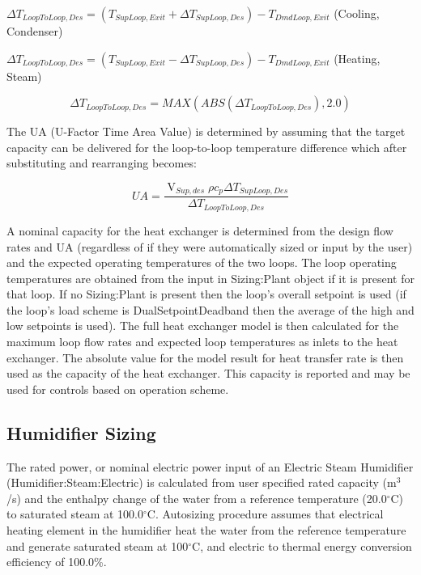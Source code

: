 \(\Delta {T_{LoopToLoop,Des}} = \left( {{T_{SupLoop,Exit}} + \Delta {T_{SupLoop,Des}}} \right) - {T_{DmdLoop,Exit}}\) (Cooling, Condenser)

\(\Delta {T_{LoopToLoop,Des}} = \left( {{T_{SupLoop,Exit}} - \Delta {T_{SupLoop,Des}}} \right) - {T_{DmdLoop,Exit}}\) (Heating, Steam)

\begin{equation}
\Delta {T_{LoopToLoop,Des}} = MAX\left( {ABS\left( {\Delta {T_{LoopToLoop,Des}}} \right),2.0} \right)
\end{equation}

The UA (U-Factor Time Area Value) is determined by assuming that the target capacity can be delivered for the loop-to-loop temperature difference which after substituting and rearranging becomes:

\begin{equation}
UA = \frac{{{{\mathop {V}\limits }_{Sup,des}}\rho {c_p}\Delta {T_{SupLoop,Des}}}}{{\Delta {T_{LoopToLoop,Des}}}}
\end{equation}

A nominal capacity for the heat exchanger is determined from the design flow rates and UA (regardless of if they were automatically sized or input by the user) and the expected operating temperatures of the two loops. The loop operating temperatures are obtained from the input in Sizing:Plant object if it is present for that loop. If no Sizing:Plant is present then the loop's overall setpoint is used (if the loop's load scheme is DualSetpointDeadband then the average of the high and low setpoints is used). The full heat exchanger model is then calculated for the maximum loop flow rates and expected loop temperatures as inlets to the heat exchanger. The absolute value for the model result for heat transfer rate is then used as the capacity of the heat exchanger. This capacity is reported and may be used for controls based on operation scheme.

\subsection{Humidifier Sizing}\label{humidifier-sizing}

The rated power, or nominal electric power input of an Electric Steam Humidifier (Humidifier:Steam:Electric) is calculated from user specified rated capacity (m\(^{3}\)/s) and the enthalpy change of the water from a reference temperature (20.0\(^{\circ}\)C) to saturated steam at 100.0\(^{\circ}\)C. Autosizing procedure assumes that electrical heating element in the humidifier heat the water from the reference temperature and generate saturated steam at 100\(^{\circ}\)C, and electric to thermal energy conversion efficiency of 100.0\%.

